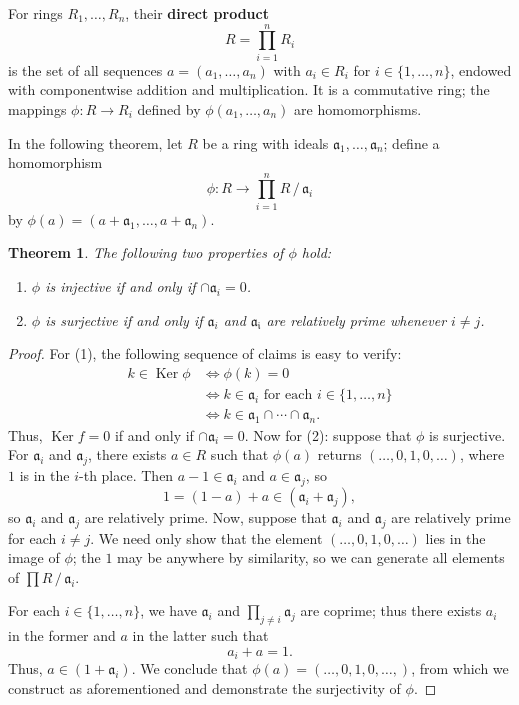 \documentclass[11pt]{article}
\newtheorem{theorem}{Theorem}
\newcommand{\Ker}{\operatorname{Ker}}
\begin{document}
For rings $R_{1}, \ldots, R_{n}$, their \textbf{direct product} 
\[
	R = \prod\limits_{i = 1}^{n} R_{i}
\]
is the set of all sequences $a = (a_{1}, \ldots, a_{n})$ with $a_{i} \in R_{i}$ for $i \in \{ 1, \ldots, n \}$, endowed with componentwise addition and multiplication. It is a commutative ring; the mappings $\phi : R \to R_{i}$ defined by $\phi(a_{1}, \ldots, a_{n})$ are homomorphisms.

In the following theorem, let $R$ be a ring with ideals $\mathfrak{a}_{1}, \ldots, \mathfrak{a}_{n}$; define a homomorphism
\[
	\phi : R \to \prod_{i = 1}^{n} R \,/\, \mathfrak{a}_{i}
\]
by $\phi(a) = (a + \mathfrak{a}_{1}, \ldots, a + \mathfrak{a}_{n})$.

\begin{adjustwidth}{0.5cm}{}
	\begin{theorem}
		The following two properties of $\phi$ hold:
		\begin{enumerate}
			\item $\phi$ is injective if and only if $\cap \mathfrak{a}_{i} = 0$.
			\item $\phi$ is surjective if and only if $\mathfrak{a}_{i}$ and $\mathfrak{a_{i}}$ are relatively prime whenever $i \ne j$.
		\end{enumerate}
	\end{theorem}
	\begin{proof}
		For (1), the following sequence of claims is easy to verify:
		\begin{align*}
			k \in \Ker \phi &\iff \phi(k) = 0 \\
			&\iff k \in \mathfrak{a}_{i} \text{ for each } i \in \{ 1, \ldots, n \} \\
			&\iff k \in \mathfrak{a}_{1} \cap \cdots \cap \mathfrak{a}_{n}.
		\end{align*}
		 Thus, $\Ker f = 0$ if and only if $\cap \mathfrak{a}_{i} = 0$. Now for (2): suppose that $\phi$ is surjective. For $\mathfrak{a}_{i}$ and $\mathfrak{a}_{j}$, there exists $a \in R$ such that $\phi(a)$ returns $(\ldots, 0, 1, 0, \ldots)$, where $1$ is in the $i$-th place. Then $a - 1 \in \mathfrak{a}_{i}$ and $a \in \mathfrak{a}_{j}$, so
		 \[
		 	1  = (1 - a) + a \in (\mathfrak{a}_{i} + \mathfrak{a}_{j}),
		 \]
		so $\mathfrak{a}_{i}$ and $\mathfrak{a}_{j}$ are relatively prime. Now, suppose that $\mathfrak{a}_{i}$ and $\mathfrak{a}_{j}$ are relatively prime for each $i \ne j$. We need only show that the element $(\ldots, 0, 1, 0, \ldots)$ lies in the image of $\phi$; the $1$ may be anywhere by similarity, so we can generate all elements of $\prod R \,/\, \mathfrak{a}_{i}$.

		For each $i \in \{ 1, \ldots, n \}$, we have $\mathfrak{a}_{i}$ and $\prod_{j \ne i} \mathfrak{a}_{j}$ are coprime; thus there exists $a_{i}$ in the former and $a$ in the latter such that
		\[
			a_{i} + a = 1.
		\]
		Thus, $a \in (1 + \mathfrak{a}_{i})$. We conclude that $\phi(a) = (\ldots, 0, 1, 0, \ldots,)$, from which we construct as aforementioned and demonstrate the surjectivity of $\phi$.
	\end{proof}
\end{adjustwidth}
\end{document}

